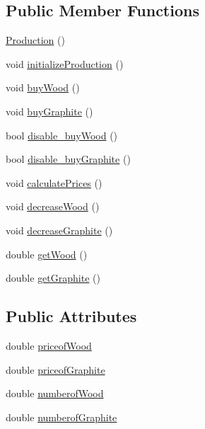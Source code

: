 \subsection*{Public Member Functions}
\begin{DoxyCompactItemize}
\item 
\hyperlink{classProduction_a12c7c685be71ed51ac10f7d0284e8d4f}{Production} ()
\item 
void \hyperlink{classProduction_ae3559bf477b74d73fa6332b59f70ed2a}{initialize\+Production} ()
\item 
void \hyperlink{classProduction_a5eea7af1f4949832bcc0c019f420d655}{buy\+Wood} ()
\item 
void \hyperlink{classProduction_adf62fb3241254aa3412ed9a9d1fb27a2}{buy\+Graphite} ()
\item 
bool \hyperlink{classProduction_a5f5c38b7f3f7b23f9029d562c7e53025}{disable\+\_\+buy\+Wood} ()
\item 
bool \hyperlink{classProduction_a4c87c63f0fdc741f9185dcda6793463e}{disable\+\_\+buy\+Graphite} ()
\item 
void \hyperlink{classProduction_a4a9bbd94b71b1d24d836d9ad79bed97b}{calculate\+Prices} ()
\item 
void \hyperlink{classProduction_a42c46b93e65cb3f84db76562a27d44f6}{decrease\+Wood} ()
\item 
void \hyperlink{classProduction_aa5180ed4aac0e3d8ecec30596c9b1751}{decrease\+Graphite} ()
\item 
double \hyperlink{classProduction_a8991aa503f8d94ae01ff9b7f08043c58}{get\+Wood} ()
\item 
double \hyperlink{classProduction_ad8e6b675848c58fcf04e214e383a87fd}{get\+Graphite} ()
\end{DoxyCompactItemize}
\subsection*{Public Attributes}
\begin{DoxyCompactItemize}
\item 
double \hyperlink{classProduction_ac6bc16863f128802bebbb52263d5558c}{priceof\+Wood}
\item 
double \hyperlink{classProduction_afca6aca1df88921b60bb7190adab5d51}{priceof\+Graphite}
\item 
double \hyperlink{classProduction_a5d77a106ee08bfb55522cdd28e0d364e}{numberof\+Wood}
\item 
double \hyperlink{classProduction_a3b0d11cefec32eeec83637e1d5252a41}{numberof\+Graphite}
\end{DoxyCompactItemize}


